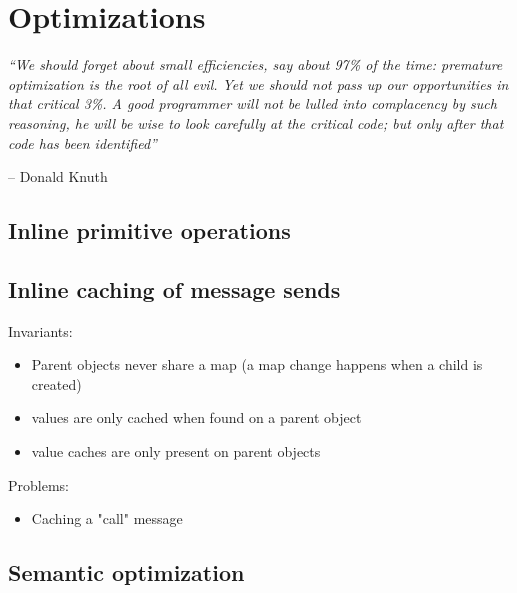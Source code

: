 \chapter{Optimizations}
\label{chap:Optimizations}

\emph{``We should forget about small efficiencies, say about 97\% of the time: premature optimization is the root of all evil. Yet we should not pass up our opportunities in that critical 3\%. A good programmer will not be lulled into complacency by such reasoning, he will be wise to look carefully at the critical code; but only after that code has been identified''}

-- Donald Knuth \\

\section{Inline primitive operations}

\section{Inline caching of message sends}

Invariants: 
\begin{itemize}
    \item Parent objects never share a map (a map change happens when a child is created)
    \item values are only cached when found on a parent object
    \item value caches are only present on parent objects
\end{itemize}

Problems:
\begin{itemize}
    \item Caching a "call" message
\end{itemize}

\section{Semantic optimization}
